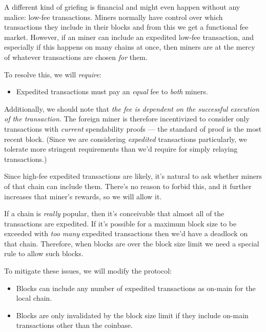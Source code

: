 A different kind of griefing is financial and might even happen without any malice: low-fee transactions.
Miners normally have control over which transactions they include in their blocks and from this we get a functional fee market.
However, if an \cR miner can include an expedited low-fee \cL transaction, and especially if this happens on many \cR chains at once, then \cL miners are at the mercy of whatever transactions are chosen \emph{for} them.

To resolve this, we will \emph{require}:
\begin{itemize}
    \item Expedited transactions must pay an \emph{equal} fee to \emph{both} miners.
\end{itemize}

Additionally, we should note that \emph{the fee is dependent on the successful execution of the transaction}.
The foreign miner is therefore incentivized to consider only transactions with \emph{current} spendability proofs --- the standard of proof is the most recent \cL block.
(Since we are considering \emph{expedited} transactions particularly, we tolerate more stringent requirements than we'd require for simply relaying transactions.)


Since high-fee expedited transactions are likely, it's natural to ask whether miners of that chain can include them.
There's no reason to forbid this, and it further increases that miner's rewards, so we will allow it.

If a chain is \emph{really} popular, then it's conceivable that almost all of the transactions are expedited.
If it's possible for a maximum block size to be exceeded with \emph{too many} expedited transactions then we'd have a deadlock on that chain.
Therefore, when blocks are over the block size limit we need a special rule to allow such blocks.

To mitigate these issues, we will modify the protocol:
\begin{itemize}
    \item Blocks can include any number of expedited transactions as on-main for the local chain.
    \item Blocks are only invalidated by the block size limit if they include on-main transactions other than the coinbase.
\end{itemize}


